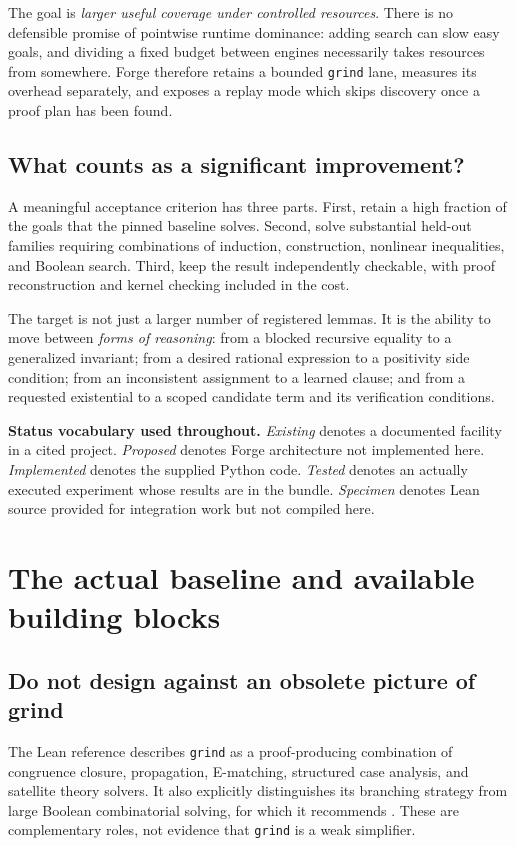 \documentclass[11pt,letterpaper]{article}
\newcommand{\code}[1]{\texttt{\detokenize{#1}}}
\newcommand{\grind}{\texttt{grind}}
\theoremstyle{definition}\newtheorem{definition}[proposition]{Definition}
\begin{document}
The goal is \emph{larger useful coverage under controlled resources}. There is no defensible promise of pointwise runtime dominance: adding search can slow easy goals, and dividing a fixed budget between engines necessarily takes resources from somewhere. Forge therefore retains a bounded \grind{} lane, measures its overhead separately, and exposes a replay mode which skips discovery once a proof plan has been found.

\subsection{What counts as a significant improvement?}
A meaningful acceptance criterion has three parts. First, retain a high fraction of the goals that the pinned baseline solves. Second, solve substantial held-out families requiring combinations of induction, construction, nonlinear inequalities, and Boolean search. Third, keep the result independently checkable, with proof reconstruction and kernel checking included in the cost.

The target is not just a larger number of registered lemmas. It is the ability to move between \emph{forms of reasoning}: from a blocked recursive equality to a generalized invariant; from a desired rational expression to a positivity side condition; from an inconsistent assignment to a learned clause; and from a requested existential to a scoped candidate term and its verification conditions.

\begin{keybox}
\textbf{Status vocabulary used throughout.}
\emph{Existing} denotes a documented facility in a cited project. \emph{Proposed} denotes Forge architecture not implemented here. \emph{Implemented} denotes the supplied Python code. \emph{Tested} denotes an actually executed experiment whose results are in the bundle. \emph{Specimen} denotes Lean source provided for integration work but not compiled here.
\end{keybox}

\section{The actual baseline and available building blocks}
\label{sec:baseline}
\subsection{Do not design against an obsolete picture of grind}
The Lean reference describes \grind{} as a proof-producing combination of congruence closure, propagation, E-matching, structured case analysis, and satellite theory solvers. It also explicitly distinguishes its branching strategy from large Boolean combinatorial solving, for which it recommends \code{bv_decide}. These are complementary roles, not evidence that \grind{} is a weak simplifier.~\cite{grindref}
\end{document}

